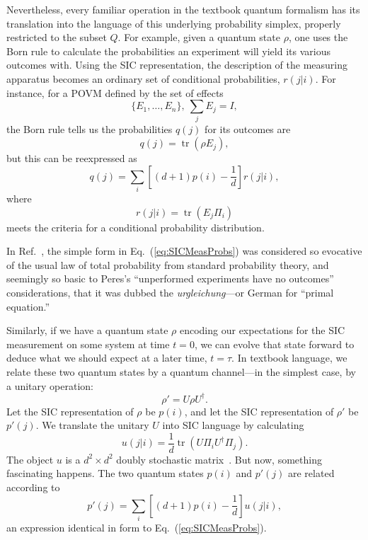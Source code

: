 \documentclass[aps,pra,superscriptaddress,10pt,tightenlines,twocolumn,nofootinbib]{revtex4}
\theoremstyle{remark}
\newcommand{\qp}{Q}
\DeclareMathOperator{\Tr}{tr}
\begin{document}
Nevertheless, every familiar operation in the textbook quantum formalism has its translation into the language of this underlying probability simplex, properly restricted to the subset $\qp$.  For example, given a quantum state $\rho$, one uses the Born rule to calculate the probabilities an experiment will yield its various outcomes with.  Using the SIC representation, the description of the measuring apparatus becomes an ordinary set of conditional probabilities, $r(j|i)$.  For instance, for a POVM defined by the set of effects
\begin{equation}
\{E_1,\ldots,E_n\},\ \sum_j E_j = I,
\end{equation}
the Born rule tells us the probabilities $q(j)$ for its outcomes are
\begin{equation}
q(j) = \Tr (\rho E_j),
\end{equation}
but this can be reexpressed as
\begin{equation}
q(j) = \sum_i \left[(d+1) p(i) - \frac{1}{d}\right] r(j|i),
\label{eq:SICMeasProbs}
\end{equation}
where
\begin{equation}
r(j|i) = \Tr (E_j\Pi_i)
\end{equation}
meets the criteria for a conditional probability distribution.

In Ref.\ \cite{fuchs2013}, the simple form in Eq.~(\ref{eq:SICMeasProbs}) was considered so evocative of the usual law of total probability from standard probability theory, and seemingly so basic to Peres's ``unperformed experiments have no outcomes'' considerations, that it was dubbed the \emph{urgleichung}---or German for ``primal equation.''

Similarly, if we have a quantum state $\rho$ encoding our expectations for the SIC measurement on some system at time $t = 0$, we can evolve that state forward to deduce what we should expect at a later time, $t = \tau$.  In textbook language, we relate these two quantum states by a quantum channel---in the simplest case, by a unitary operation:
\begin{equation}
\rho' = U \rho U^\dag.
\end{equation}
Let the SIC representation of $\rho$ be $p(i)$, and let the SIC representation of $\rho'$ be $p'(j)$.  We translate the unitary $U$ into SIC language by calculating
\begin{equation}
u(j|i) = \frac{1}{d}\Tr\left(U\Pi_i U^\dag \Pi_j\right).
\end{equation}
The object $u$ is a $d^2 \times d^2$ doubly stochastic matrix~\cite{DStoch}.  But now, something fascinating happens.  The two quantum states $p(i)$ and $p'(j)$ are related according to
\begin{equation}
p'(j) = \sum_i \left[(d+1) p(i) - \frac{1}{d}\right] u(j|i),
\label{eq:SICTimeEvol}
\end{equation}
an expression identical in form to Eq.\ (\ref{eq:SICMeasProbs}).
\end{document}
